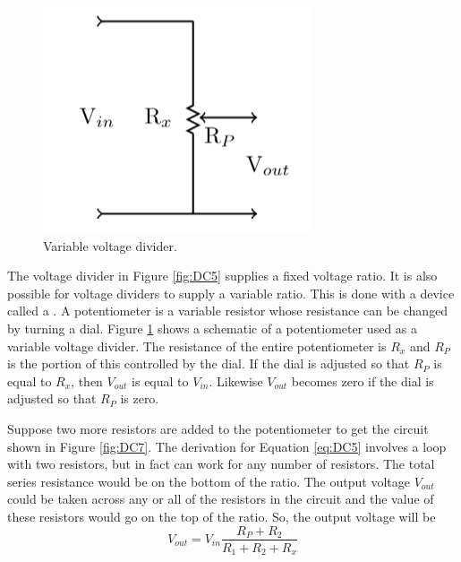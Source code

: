 \documentclass[12pt, a4paper, oneside, openright, titlepage]{book}
\begin{document}
\begin{figure}[H]
    \centering
    \includegraphics[scale = 0.8]{Images/DC6.PNG}
    \caption{Variable voltage divider.}
    \label{fig:DC6}
\end{figure}

The voltage divider in Figure \ref{fig:DC5} supplies a fixed voltage ratio. It is also possible for voltage dividers to supply a variable ratio. This is done with a device called a . A potentiometer is a variable resistor whose resistance can be changed by turning a dial. Figure \ref{fig:DC6} shows a schematic of a potentiometer used as a variable voltage divider. The resistance of the entire potentiometer is $R_x$ and $R_P$ is the portion of this controlled by the dial. If the dial is adjusted so that $R_P$ is equal to $R_x$, then $V_{out}$ is equal to $V_{in}$. Likewise $V_{out}$ becomes zero if the dial is adjusted so that $R_P$ is zero.

\noindent Suppose two more resistors are added to the potentiometer to get the circuit shown in Figure \ref{fig:DC7}. The derivation for Equation \ref{eq:DC5} involves a loop with two resistors, but in fact can work for any number of resistors. The total series resistance would be on the bottom of the ratio. The output voltage $V_{out}$ could be taken across any or all of the resistors in the circuit and the value of these resistors would go on the top of the ratio. So, the output voltage will be \begin{equation}\label{eq:DC6}
    V_{out} = V_{in}\frac{R_P+R_2}{R_1+R_2+R_x}
\end{equation}
\end{document}
